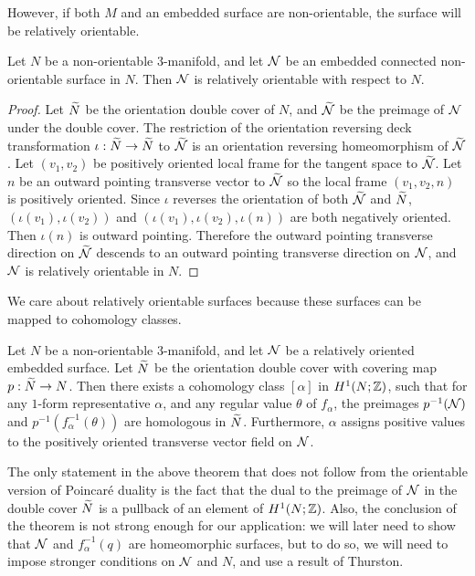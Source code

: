 However, if both $M$ and an embedded surface are non-orientable, the surface will be relatively orientable.
\begin{prop}
  \label{prop:relative-orientability}
  Let $N$ be a non-orientable $3$-manifold, and let $\mathcal{N}$ be an embedded connected non-orientable surface in $N$.
  Then $\mathcal{N}$ is relatively orientable with respect to $N$.
\end{prop}
\begin{proof}
  Let $\widetilde{N}$ be the orientation double cover of $N$, and $\widetilde{\mathcal{N}}$ be the preimage of $\mathcal{N}$ under the double cover.
  The restriction of the orientation reversing deck transformation $\iota:\widetilde{N}\rightarrow\widetilde{N}$ to $\widetilde{\mathcal{N}}$ is an orientation reversing homeomorphism of $\widetilde{\mathcal{N}}$.
  Let $(v_1, v_2)$ be positively oriented local frame for the tangent space to $\widetilde{\mathcal{N}}$.
  Let $n$ be an outward pointing transverse vector to $\widetilde{\mathcal{N}}$ so the local frame $(v_1, v_2, n)$ is positively oriented.
  Since $\iota$ reverses the orientation of both $\widetilde{\mathcal{N}}$ and $\widetilde{N}$, $(\iota(v_1), \iota(v_2))$ and $(\iota(v_1), \iota(v_2), \iota(n))$ are both negatively oriented.
  Then $\iota(n)$ is outward pointing.
  Therefore the outward pointing transverse direction on $\widetilde{\mathcal{N}}$ descends to an outward pointing transverse direction on $\mathcal{N}$, and $\mathcal{N}$ is relatively orientable in $N$.
\end{proof}

We care about relatively orientable surfaces because these surfaces can be mapped to cohomology classes.
\begin{thm}
  \label{thm:Poincare-duality}
  Let $N$ be a non-orientable $3$-manifold, and let $\mathcal{N}$ be a relatively oriented embedded surface.  Let $\widetilde{N}$ be the orientation double cover with covering map $p:\widetilde{N}\to N$.
  Then there exists a cohomology class $[\alpha]$ in $H^1(N; \mathbb{Z})$, such that for any $1$-form representative $\alpha$, and any regular value $\theta$ of $f_{\alpha}$, the preimages $p^{-1}(\mathcal{N})$ and $p^{-1}(f_{\alpha}^{-1}(\theta))$ are homologous in $\widetilde{N}$.
  Furthermore, $\alpha$ assigns positive values to the positively oriented transverse vector field on $\mathcal{N}$.
\end{thm}
\begin{rem}
  The only statement in the above theorem that does not follow from the orientable version of Poincar\'e duality is the fact that the dual to the preimage of $\mathcal{N}$ in the double cover $\widetilde{N}$ is a pullback of an element of $H^1(N; \mathbb{Z})$. Also, the conclusion of the theorem is not strong enough for our application: we will later need to show that $\mathcal{N}$ and $f_{\alpha}^{-1}(q)$ are homeomorphic surfaces, but to do so, we will need to impose stronger conditions on $\mathcal{N}$ and $N$, and use a result of Thurston.
\end{rem}

